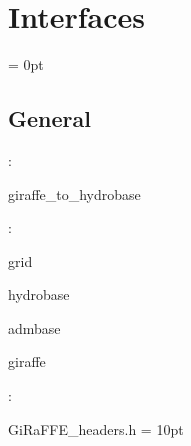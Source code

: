 
\section{Interfaces} 


\parskip = 0pt

\vspace{3mm} \subsection*{General}

: 

giraffe\_to\_hydrobase
\vspace{2mm}

: 

grid

hydrobase

admbase

giraffe
\vspace{2mm}

\vspace{5mm}

: 

GiRaFFE\_headers.h
\vspace{2mm}\parskip = 10pt 
